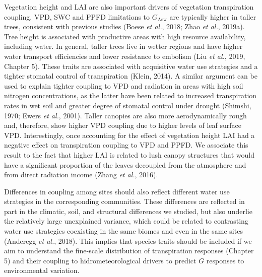 \documentclass[11pt,twoside]{reedthesis}
\begin{document}
Vegetation height and LAI are also important drivers of vegetation
transpiration coupling. VPD, SWC and PPFD limitations to
\(G_{\text{Asw}}\) are typically higher in taller trees, consistent with
previous studies (Boese \emph{et al.}, 2018; Zhao \emph{et al.}, 2019a).
Tree height is associated with productive areas with high resource
availability, including water. In general, taller trees live in wetter
regions and have higher water transport efficiencies and lower
resistance to embolism (Liu \emph{et al.}, 2019, Chapter 5). These
traits are associated with acquisitive water use strategies and a
tighter stomatal control of transpiration (Klein, 2014). A similar
argument can be used to explain tighter coupling to VPD and radiation in
areas with high soil nitrogen concentrations, as the latter have been
related to increased transpiration rates in wet soil and greater degree
of stomatal control under drought (Shimshi, 1970; Ewers \emph{et al.},
2001). Taller canopies are also more aerodynamically rough and,
therefore, show higher VPD coupling due to higher levels of leaf surface
VPD. Interestingly, once accounting for the effect of vegetation height
LAI had a negative effect on transpiration coupling to VPD and PPFD. We
associate this result to the fact that higher LAI is related to lush
canopy structures that would have a significant proportion of the leaves
decoupled from the atmosphere and from direct radiation income (Zhang
\emph{et al.}, 2016).\par

Differences in coupling among sites should also reflect different water
use strategies in the corresponding communities. These differences are
reflected in part in the climatic, soil, and structural differences we
studied, but also underlie the relatively large unexplained variance,
which could be related to contrasting water use strategies coexisting in
the same biomes and even in the same sites (Anderegg \emph{et al.},
2018). This implies that species traits should be included if we aim to
understand the fine-scale distribution of transpiration responses
(Chapter 5) and their coupling to hidrometeorological drivers to predict
\(G\) responses to environmental variation.\par
\end{document}
